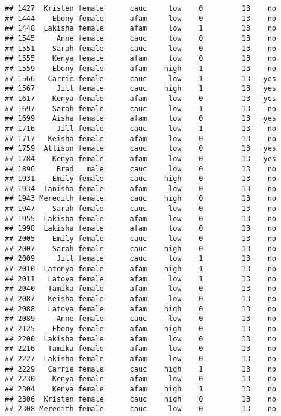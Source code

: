 \documentclass[
]{article}
\begin{document}
\begin{verbatim}
## 1427  Kristen female      cauc     low    0         13    no
## 1444    Ebony female      afam     low    0         13    no
## 1448  Lakisha female      afam     low    1         13    no
## 1545     Anne female      cauc     low    0         13    no
## 1551    Sarah female      cauc     low    0         13    no
## 1555    Kenya female      afam     low    0         13    no
## 1559    Ebony female      afam    high    1         13    no
## 1566   Carrie female      cauc     low    1         13   yes
## 1567     Jill female      cauc    high    1         13   yes
## 1617    Kenya female      afam     low    0         13   yes
## 1697    Sarah female      cauc     low    1         13    no
## 1699    Aisha female      afam     low    0         13   yes
## 1716     Jill female      cauc     low    1         13    no
## 1717   Keisha female      afam     low    0         13    no
## 1759  Allison female      cauc     low    0         13   yes
## 1784    Kenya female      afam     low    0         13   yes
## 1896     Brad   male      cauc     low    0         13    no
## 1931    Emily female      cauc    high    0         13    no
## 1934  Tanisha female      afam     low    0         13    no
## 1943 Meredith female      cauc    high    0         13    no
## 1947    Sarah female      cauc     low    0         13    no
## 1955  Lakisha female      afam     low    0         13    no
## 1998  Lakisha female      afam     low    0         13    no
## 2005    Emily female      cauc     low    0         13    no
## 2007    Sarah female      cauc    high    0         13    no
## 2009     Jill female      cauc     low    1         13    no
## 2010  Latonya female      afam    high    1         13    no
## 2011   Latoya female      afam     low    1         13    no
## 2040   Tamika female      afam     low    0         13    no
## 2087   Keisha female      afam     low    0         13    no
## 2088   Latoya female      afam    high    0         13    no
## 2089     Anne female      cauc     low    0         13    no
## 2125    Ebony female      afam    high    0         13    no
## 2200  Lakisha female      afam     low    0         13    no
## 2216   Tamika female      afam     low    0         13    no
## 2227  Lakisha female      afam     low    0         13    no
## 2229   Carrie female      cauc    high    1         13    no
## 2230    Kenya female      afam     low    0         13    no
## 2304    Kenya female      afam    high    1         13    no
## 2306  Kristen female      cauc    high    0         13    no
## 2308 Meredith female      cauc     low    0         13    no

\end{verbatim}
\end{document}
